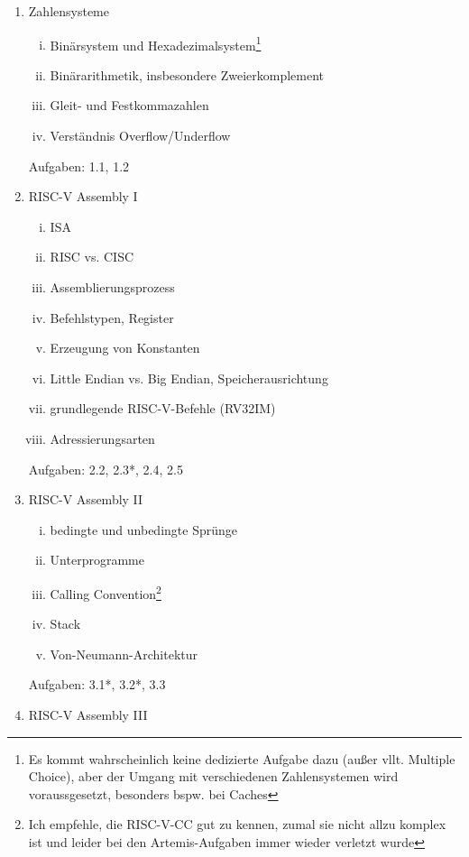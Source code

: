 \documentclass{article}
\begin{document}
\begin{enumerate}
	\item Zahlensysteme
	      \begin{enumerate}[i.]
		      \item Binärsystem und Hexadezimalsystem\footnote{Es kommt wahrscheinlich
			            keine dedizierte Aufgabe dazu (außer vllt. Multiple Choice), aber der Umgang
			            mit verschiedenen Zahlensystemen wird voraussgesetzt, besonders bspw. bei Caches}
		      \item Binärarithmetik, insbesondere Zweierkomplement
		      \item Gleit- und Festkommazahlen
		      \item Verständnis Overflow/Underflow
	      \end{enumerate}
	      Aufgaben: 1.1, 1.2
	\item RISC-V Assembly I
	      \begin{enumerate}[i.]
		      \item ISA
		      \item RISC vs. CISC
		      \item Assemblierungsprozess
		      \item Befehlstypen, Register
		      \item Erzeugung von Konstanten
		      \item Little Endian vs. Big Endian, Speicherausrichtung
		      \item grundlegende RISC-V-Befehle (RV32IM)
		      \item Adressierungsarten
	      \end{enumerate}
	      Aufgaben: 2.2, 2.3*, 2.4, 2.5
	\item RISC-V Assembly II
	      \begin{enumerate}[i.]
		      \item bedingte und unbedingte Sprünge
		      \item Unterprogramme
		      \item Calling Convention\footnote{Ich empfehle, die RISC-V-CC gut
			            zu kennen, zumal sie nicht allzu komplex ist und leider bei den Artemis-Aufgaben
			            immer wieder verletzt wurde}
		      \item Stack
		      \item Von-Neumann-Architektur
	      \end{enumerate}
	      Aufgaben: 3.1*, 3.2*, 3.3
	\item RISC-V Assembly III
	      \begin{enumerate}[i.]

\end{enumerate}
\end{enumerate}
\end{document}
